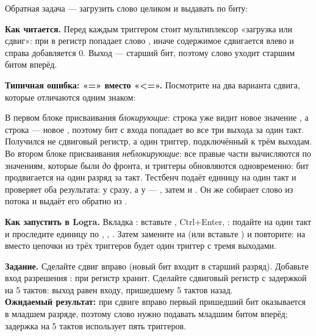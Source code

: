 Обратная задача --- загрузить слово целиком и выдавать по биту:


\textbf{Как читается.} Перед каждым триггером стоит мультиплексор «загрузка
или сдвиг»: при  в регистр попадает слово , иначе
содержимое сдвигается влево и справа добавляется 0. Выход  ---
старший бит, поэтому слово уходит старшим битом вперёд.

\textbf{Типичная ошибка: «=» вместо «<=».} Посмотрите на два варианта
сдвига, которые отличаются одним знаком:



В первом блоке присваивания \emph{блокирующие}: строка  уже
видит новое значение , а строка  --- новое ,
поэтому бит с входа  попадает во все три выхода за один такт.
Получился не сдвиговый регистр, а один триггер, подключённый к трём выходам.
Во втором блоке присваивания \emph{неблокирующие}: все правые части
вычисляются по значениям, которые были \emph{до} фронта, и триггеры
обновляются одновременно: бит продвигается на один разряд за такт.
Тестбенч  подаёт единицу на один такт и проверяет оба
результата:  у  сразу, а у  ---
, затем  и . Он же собирает слово 
из потока и выдаёт его обратно из .

\textbf{Как запустить в Logra.} Вкладка : вставьте
, Ctrl+Enter, : подайте  на один
такт и проследите единицу по , , . Затем замените
\code{<=} на \code{=} (или вставьте ) и повторите: на
 вместо цепочки из трёх триггеров будет один триггер с тремя
выходами.

\begin{diybox}
\textbf{Задание.}  Сделайте сдвиг вправо (новый бит входит в старший
разряд).  Добавьте вход разрешения : при  регистр
хранит.  Сделайте сдвиговый регистр с задержкой на 5 тактов:
выход равен входу, пришедшему 5 тактов назад.\\
\textbf{Ожидаемый результат:} при сдвиге вправо первый пришедший бит
оказывается в младшем разряде, поэтому слово нужно подавать младшим битом
вперёд; задержка на 5 тактов использует пять триггеров.
\end{diybox}

